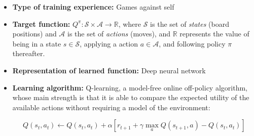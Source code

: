 \documentclass{article}
\begin{document}
\begin{itemize}

    \item \textbf{Type of training experience:} Games against self

    \item \textbf{Target function:} $Q^\pi : \mathcal{S} \times \mathcal{A} \to \mathbb{R}$, where
        $\mathcal{S}$ is the set of \emph{states} (board positions) and $\mathcal{A}$ is the set of
        \emph{actions} (moves), and $\mathbb{R}$ represents the value of being in a state $s \in
        \mathcal{S}$, applying a action $a \in \mathcal{A}$, and following policy $\pi$ thereafter.

    \item \textbf{Representation of learned function:} Deep neural network

    \item \textbf{Learning algorithm:} Q-learning, a model-free online off-policy algorithm, whose
        main strength is that it is able to compare the expected utility of the available actions
        without requiring a model of the environment:

        \begin{equation}
        Q(s_t, a_t) \gets Q(s_t, a_t) + \alpha [r_{t+1} + \gamma \max_a Q(s_{t+1}, a) - Q(s_t, a_t)]
        \end{equation}


\end{itemize}




\end{document}
